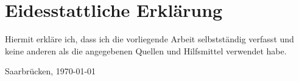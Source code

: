 \vspace{1.5cm}

\section*{Eidesstattliche Erkl{\"a}rung}
Hiermit erkl{\"a}re ich, dass ich die vorliegende Arbeit selbstst{\"a}ndig verfasst und keine anderen als die angegebenen Quellen und Hilfsmittel verwendet habe.\par
\vspace{1cm}
Saarbr{\"u}cken, \today \hspace{1cm}\underline{\hspace{5.5cm}}
\newpage







